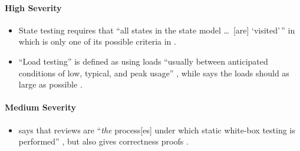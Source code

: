 \paragraph{High Severity}
\begin{itemize}
      \item %
            State testing requires that ``all states in the state model
            \dots\ [are] `visited'\,'' in \citep[p.~19]{IEEE2021} which
            is only one of its possible criteria in \citep[pp.~82-83]{Patton2006}.
      \item %
            ``Load testing'' is defined as using loads ``usually between
            anticipated conditions of low, typical, and peak usage''
            \citep[p.~5]{IEEE2022}, while \citeauthor{Patton2006} says the
            loads should as large as possible \citeyearpar[p.~86]{Patton2006}.
\end{itemize}

\paragraph{Medium Severity}
\begin{itemize}
      \item %
            \citeauthor{Patton2006} says that reviews are ``\emph{the} process[es]
            under which static white-box testing is performed''
            \citeyearpar[p.~92, emphasis added]{Patton2006}, but
            \citeauthor{vanVliet2000} also gives correctness proofs
            \citeyearpar[pp.~418-419]{vanVliet2000}.
\end{itemize}

